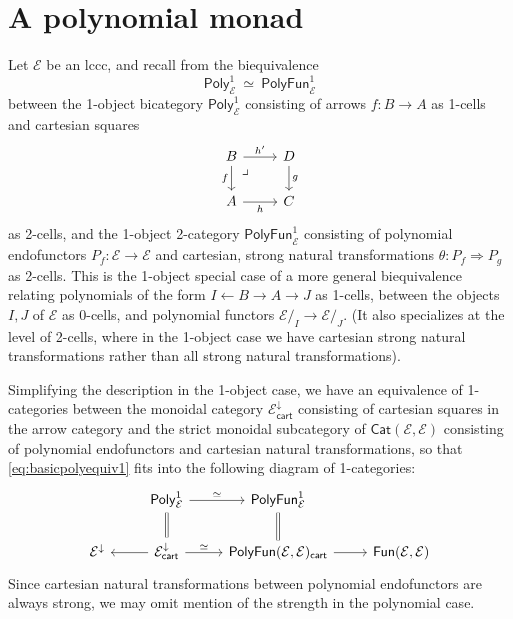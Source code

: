 \documentclass[12pt,reqno]{amsart}
\newcommand{\EE}{\ensuremath{\mathcal{E}}}
\newcommand{\Cat}{\ensuremath{\mathsf{Cat}}}
\renewcommand{\to}{\ensuremath{\rightarrow}}
\newcommand{\pbcorner}{\arrow[dr,phantom,"\lrcorner" very near start, shift right=.5ex]} %
\theoremstyle{remark}
\theoremstyle{definition}
\begin{document}
\section{A polynomial monad}\label{sec:Monad}
%

Let $\EE$ be an lccc, and recall from \cite[Theorem 2.17]{GambinoKoch:2013} the biequivalence 
\begin{equation}\label{eq:basicpolyequiv1}
\mathsf{Poly}^1_{\EE}\ \simeq\ \mathsf{PolyFun}^1_{\EE}
\end{equation}
between the 1-object bicategory $\mathsf{Poly}^1_{\EE}$ consisting of arrows $f:B \to A$ as 1-cells and cartesian squares
\begin{equation}\label{diag:cartsquare}
\begin{tikzcd}
B \ar[d,swap, "f"] \ar[r, "{h'}"] \pbcorner & D \ar[d, "g"] \\
A \ar[r,swap, "{h}"] &  C 
\end{tikzcd}
\end{equation}
as 2-cells, and the 1-object 2-category $\mathsf{PolyFun}^1_{\EE}$ consisting of polynomial endofunctors $P_f: \EE\to \EE$ and cartesian, strong natural transformations $\theta : P_f \Rightarrow P_g$ as 2-cells.  This is the 1-object special case of a more general biequivalence relating polynomials of the form $I \leftarrow B \to A \to J$ as 1-cells, between the objects $I, J$ of $\EE$ as 0-cells, and polynomial functors $\EE/_I \to \EE/_J$. (It also specializes at the level of 2-cells, where in the 1-object case we have cartesian strong natural transformations rather than all strong natural transformations).  

Simplifying the description in the 1-object case, we have an equivalence of 1-categories between the monoidal category $\EE^{\downarrow}_{\mathsf{cart}}$ consisting of cartesian squares in the arrow category and the strict monoidal subcategory of $\Cat(\EE, \EE)$ consisting of polynomial endofunctors and cartesian natural transformations, so that \eqref{eq:basicpolyequiv1} fits into the following diagram of 1-categories:
\begin{equation}\label{diagram:polyandpolyfun}
\begin{tikzcd}
& \mathsf{Poly}^1_{\EE} \ar[d,equals] \ar[r,"{\simeq}"] & \mathsf{PolyFun}^1_{\EE}  \ar[d,equals] &\\
\EE^{\downarrow}  &\EE^{\downarrow}_{\mathsf{cart}} \ar[l] \ar[r,"{\simeq}"] & \mathsf{PolyFun}(\EE, \EE)_{\mathsf{cart}}  \ar[r] & \mathsf{Fun}(\EE, \EE)
\end{tikzcd}
\end{equation}
Since cartesian natural transformations between polynomial endofunctors are always strong, we may omit mention of the strength in the polynomial case.
\end{document}
